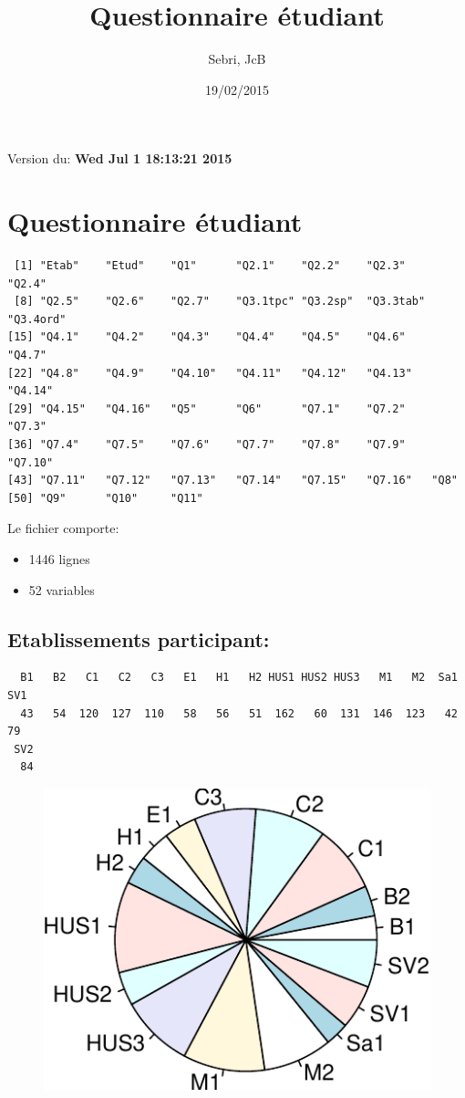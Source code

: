 \documentclass[]{article}
\title{Questionnaire étudiant}
\author{Sebri, JcB}
\date{19/02/2015}
\begin{document}
\maketitle


{
\hypersetup{linkcolor=black}
\setcounter{tocdepth}{2}
\tableofcontents
}
Version du: \textbf{Wed Jul 1 18:13:21 2015}

\section{Questionnaire étudiant}\label{questionnaire-etudiant}

\begin{verbatim}
 [1] "Etab"    "Etud"    "Q1"      "Q2.1"    "Q2.2"    "Q2.3"    "Q2.4"   
 [8] "Q2.5"    "Q2.6"    "Q2.7"    "Q3.1tpc" "Q3.2sp"  "Q3.3tab" "Q3.4ord"
[15] "Q4.1"    "Q4.2"    "Q4.3"    "Q4.4"    "Q4.5"    "Q4.6"    "Q4.7"   
[22] "Q4.8"    "Q4.9"    "Q4.10"   "Q4.11"   "Q4.12"   "Q4.13"   "Q4.14"  
[29] "Q4.15"   "Q4.16"   "Q5"      "Q6"      "Q7.1"    "Q7.2"    "Q7.3"   
[36] "Q7.4"    "Q7.5"    "Q7.6"    "Q7.7"    "Q7.8"    "Q7.9"    "Q7.10"  
[43] "Q7.11"   "Q7.12"   "Q7.13"   "Q7.14"   "Q7.15"   "Q7.16"   "Q8"     
[50] "Q9"      "Q10"     "Q11"    
\end{verbatim}

Le fichier comporte:

\begin{itemize}
\itemsep1pt\parskip0pt
\item
  1446 lignes
\item
  52 variables
\end{itemize}

\subsection{Etablissements
participant:}\label{etablissements-participant}

\begin{verbatim}
  B1   B2   C1   C2   C3   E1   H1   H2 HUS1 HUS2 HUS3   M1   M2  Sa1  SV1 
  43   54  120  127  110   58   56   51  162   60  131  146  123   42   79 
 SV2 
  84 
\end{verbatim}

\begin{figure}[htbp]
\centering
\includegraphics{qs_etudiants_files/figure-latex/participants-1.pdf}
\end{figure}
\end{document}
